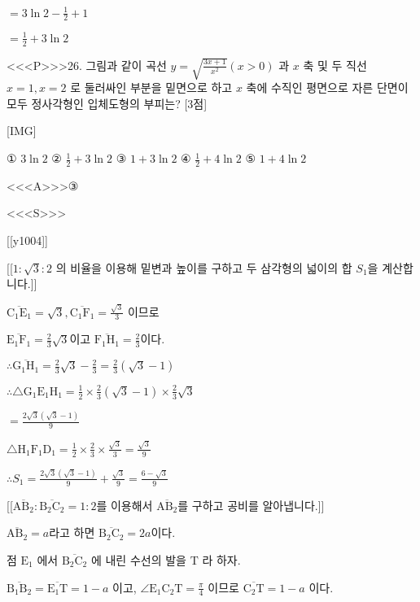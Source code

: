 \documentclass{oblivoir}
\begin{document}
$=3 \ln 2-\frac{1}{2}+1$

$=\frac{1}{2}+3 \ln 2$


<<<P>>>26. 그림과 같이 곡선 $y=\sqrt{\frac{3 x+1}{x^{2}}}(x>0)$ 과 $x$ 축 및 두 직선 $x=1, x=2$ 로 둘러싸인 부분을 밑면으로 하고 $x$ 축에 수직인 평면으로 자른 단면이 모두 정사각형인 입체도형의 부피는? [3점]

[IMG]

① $3 \ln 2$
② $\frac{1}{2}+3 \ln 2$
③ $1+3 \ln 2$
④ $\frac{1}{2}+4 \ln 2$
⑤ $1+4 \ln 2$



<<<A>>>③

<<<S>>>

[[y1004]]

[[$1 : \sqrt{3} : 2$ 의 비율을 이용해 밑변과 높이를 구하고 두 삼각형의 넓이의 합 $S_{1}$을 계산합니다.]]

$\overline{\mathrm{C}_{1} \mathrm{E}_{1}}=\sqrt{3}, \overline{\mathrm{C}_{1} \mathrm{F}_{1}}=\frac{\sqrt{3}}{3}$ 이므로

$\overline{\mathrm{E}_{1} \mathrm{F}_{1}}=\frac{2}{3} \sqrt{3}$이고 $\overline{\mathrm{F}_{1} \mathrm{H}_{1}}=\frac{2}{3}$이다.

$\therefore \overline{\mathrm{G}_{1} \mathrm{H}_{1}}=\frac{2}{3} \sqrt{3}-\frac{2}{3}=\frac{2}{3}(\sqrt{3}-1)$

$\therefore \triangle \mathrm{G}_{1} \mathrm{E}_{1} \mathrm{H}_{1}=\frac{1}{2} \times \frac{2}{3}(\sqrt{3}-1) \times \frac{2}{3} \sqrt{3}$

$=\frac{2 \sqrt{3}(\sqrt{3}-1)}{9}$

$\triangle \mathrm{H}_{1} \mathrm{F}_{1} \mathrm{D}_{1}=\frac{1}{2} \times \frac{2}{3} \times \frac{\sqrt{3}}{3}=\frac{\sqrt{3}}{9}$

$\therefore S_{1}=\frac{2 \sqrt{3}(\sqrt{3}-1)}{9}+\frac{\sqrt{3}}{9}=\frac{6-\sqrt{3}}{9}$

[[$\overline{\mathrm{AB}_{2}}: \overline{\mathrm{B}_{2} \mathrm{C}_{2}}=1: 2$를 이용해서 $\overline{\mathrm{AB}_{2}}$를 구하고 공비를 알아냅니다.]]

$\overline{\mathrm{AB}_{2}}=a$라고 하면 $\overline{\mathrm{B}_{2} \mathrm{C}_{2}}=2 a$이다.


점 $\mathrm{E}_{1}$ 에서 $\overline{\mathrm{B}_{2} \mathrm{C}_{2}}$ 에 내린 수선의 발을 $\mathrm{T}$ 라 하자.

$\overline{\mathrm{B}_{1} \mathrm{B}_{2}}=\overline{\mathrm{E}_{1} \mathrm{T}}=1-a$ 이고, 
$\angle \mathrm{E}_{1} \mathrm{C}_{2} \mathrm{T}=\frac{\pi}{4}$ 이므로 $\overline{\mathrm{C}_{2} \mathrm{T}}=1-a$ 이다. 
\end{document}
